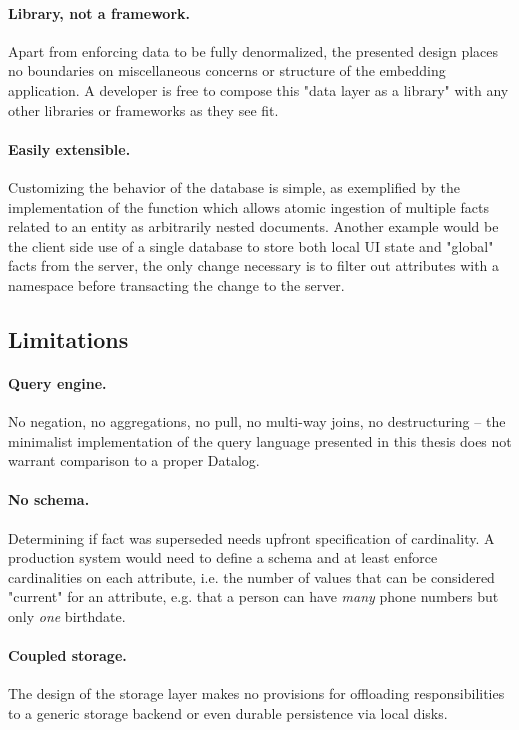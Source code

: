 \paragraph{Library, not a framework.} Apart from enforcing data to be fully denormalized, the presented design places no boundaries on miscellaneous concerns or structure of the embedding application. A developer is free to compose this "data layer as a library" with any other libraries or frameworks as they see fit.

\paragraph{Easily extensible.} Customizing the behavior of the database is simple, as exemplified by the implementation of the  function which allows atomic ingestion of multiple facts related to an entity as arbitrarily nested documents. Another example would be the client side use of a single database to store both local \gls{UI} state and "global" facts from the server, the only change necessary is to filter out attributes with a  namespace before transacting the change to the server.



\subsection{Limitations}

\paragraph{Query engine.} No negation, no aggregations, no pull, no multi-way joins, no destructuring -- the minimalist implementation of the query language presented in this thesis does not warrant comparison to a proper Datalog.

\paragraph{No schema.} Determining if fact was superseded needs upfront specification of cardinality. A production system would need to define a schema and at least enforce cardinalities on each attribute, i.e. the number of values that can be considered "current" for an attribute, e.g. that a person can have \emph{many} phone numbers but only \emph{one} birthdate.

\paragraph{Coupled storage.} The design of the storage layer makes no provisions for offloading responsibilities to a generic storage backend or even durable persistence via local disks.

